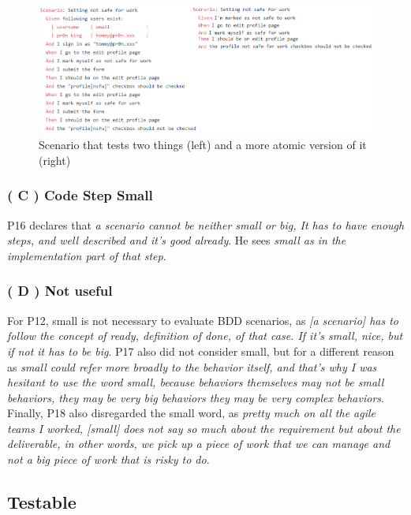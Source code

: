 \begin{figure}[t]
	\centering
	\includegraphics[scale=0.8]{images/not_safe_for_work_atomic_small_bad_example_P6}
	\caption[Scenario that tests two things and a more atomic version]{Scenario that tests two things (left) and a more atomic version of it (right)}
	\label{fig:atomic_small_bad_example}
\end{figure}

\subsubsection{\textbf{( C ) Code Step Small}}
P16 declares that \textit{a scenario cannot be neither small or big, It has to have enough steps, and well described and it's good already}. He sees \textit{small as in the implementation part of that step}.

\subsubsection{\textbf{( D ) Not useful}}

For P12, small is not necessary to evaluate BDD scenarios, as \textit{[a scenario] has to follow the concept of ready, definition of done, of that case. If it's small, nice, but if not it has to be big}. P17 also did not consider small, but for a different reason as \textit{small could refer more broadly to the behavior itself, and that's why I was hesitant to use the word small, because behaviors themselves may not be small behaviors, they may be very big behaviors they may be very complex behaviors}. Finally, P18 also disregarded the small word, as \textit{pretty much on all the agile teams I worked, [small] does not say so much about the requirement but about the deliverable, in other words, we pick up a piece of work that we can manage and not a big piece of work that is risky to do}.

\subsection{Testable}

